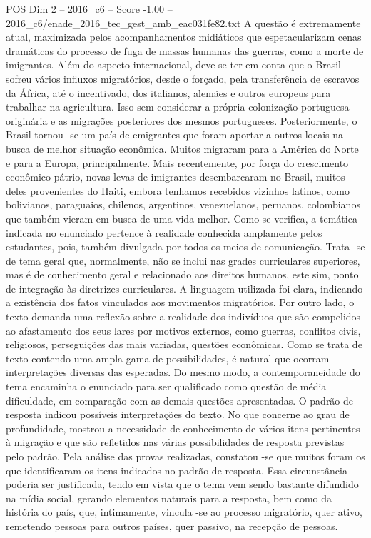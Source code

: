 \begin{textsample}{POS Dim 2 – 2016\_c6 – Score -1.00 – 2016\_c6/enade\_2016\_tec\_gest\_amb\_eac031fe82.txt}
A questão é extremamente atual, maximizada pelos acompanhamentos midiáticos que espetacularizam cenas dramáticas do processo de fuga de massas humanas das guerras, como a morte de imigrantes.
Além do aspecto internacional, deve se ter em conta que o Brasil sofreu vários influxos migratórios, desde o forçado, pela transferência de escravos da África, até o incentivado, dos italianos, alemães e outros europeus para trabalhar na agricultura.
Isso sem considerar a própria colonização portuguesa originária e as migrações posteriores dos mesmos portugueses.
Posteriormente, o Brasil tornou -se um país de emigrantes que foram aportar a outros locais na busca de melhor situação econômica.
Muitos migraram para a América do Norte e para a Europa, principalmente.
Mais recentemente, por força do crescimento econômico pátrio, novas levas de imigrantes desembarcaram no Brasil, muitos deles provenientes do Haiti, embora tenhamos recebidos vizinhos latinos, como bolivianos, paraguaios, chilenos, argentinos, venezuelanos, peruanos, colombianos que também vieram em busca de uma vida melhor.
Como se verifica, a temática indicada no enunciado pertence à realidade conhecida amplamente pelos estudantes, pois, também divulgada por todos os meios de comunicação.
Trata -se de tema geral que, normalmente, não se inclui nas grades curriculares superiores, mas é de conhecimento geral e relacionado aos direitos humanos, este sim, ponto de integração às diretrizes curriculares.
A linguagem utilizada foi clara, indicando a existência dos fatos vinculados aos movimentos migratórios.
Por outro lado, o texto demanda uma reflexão sobre a realidade dos indivíduos que são compelidos ao afastamento dos seus lares por motivos externos, como guerras, conflitos civis, religiosos, perseguições das mais variadas, questões econômicas.
Como se trata de texto contendo uma ampla gama de possibilidades, é natural que ocorram interpretações diversas das esperadas.
Do mesmo modo, a contemporaneidade do tema encaminha o enunciado para ser qualificado como questão de média dificuldade, em comparação com as demais questões apresentadas.
O padrão de resposta indicou possíveis interpretações do texto.
No que concerne ao grau de profundidade, mostrou a necessidade de conhecimento de vários itens pertinentes à migração e que são refletidos nas várias possibilidades de resposta previstas pelo padrão.
Pela análise das provas realizadas, constatou -se que muitos foram os que identificaram os itens indicados no padrão de resposta.
Essa circunstância poderia ser justificada, tendo em vista que o tema vem sendo bastante difundido na mídia social, gerando elementos naturais para a resposta, bem como da história do país, que, intimamente, vincula -se ao processo migratório, quer ativo, remetendo pessoas para outros países, quer passivo, na recepção de pessoas.

\end{textsample}
